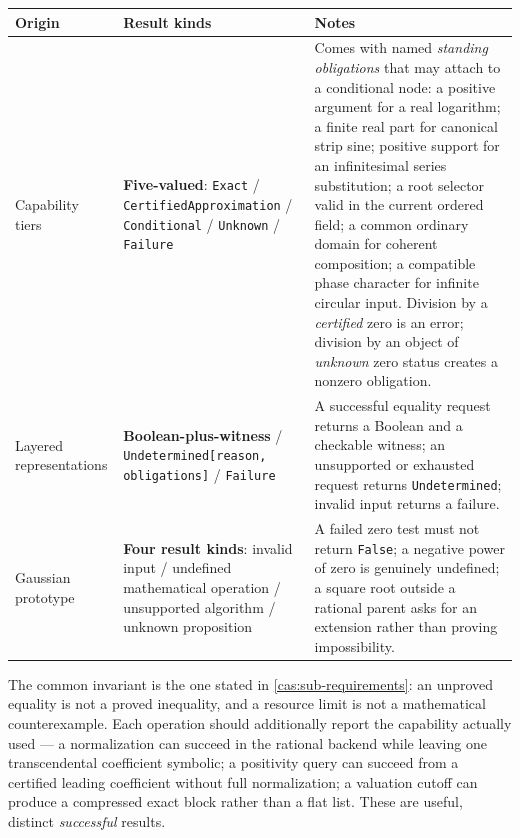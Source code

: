 \documentclass[11pt,letterpaper]{article}
\numberwithin{equation}{section}
\theoremstyle{definition}
\theoremstyle{remark}
\begin{document}
\begingroup\small
\begin{longtable}{@{}P{0.155\textwidth}P{0.40\textwidth}P{0.38\textwidth}@{}}
\toprule
Origin & Result kinds & Notes\\
\midrule\endhead
Capability tiers & \textbf{Five-valued}: \texttt{Exact} /
\texttt{CertifiedApproximation} / \texttt{Conditional} / \texttt{Unknown} /
\texttt{Failure} & Comes with named \emph{standing obligations} that may attach
to a conditional node: a positive argument for a real logarithm; a finite real
part for canonical strip sine; positive support for an infinitesimal series
substitution; a root selector valid in the current ordered field; a common
ordinary domain for coherent composition; a compatible phase character for
infinite circular input. Division by a \emph{certified} zero is an error;
division by an object of \emph{unknown} zero status creates a nonzero
obligation.\\[0.5em]
Layered representations & \textbf{Boolean-plus-witness} /
\texttt{Undetermined[reason, obligations]} / \texttt{Failure} & A successful
equality request returns a Boolean and a checkable witness; an unsupported or
exhausted request returns \texttt{Undetermined}; invalid input returns a
failure.\\[0.5em]
Gaussian prototype & \textbf{Four result kinds}: invalid input / undefined
mathematical operation / unsupported algorithm / unknown proposition & A failed
zero test must not return \texttt{False}; a negative power of zero is genuinely
undefined; a square root outside a rational parent asks for an extension rather
than proving impossibility.\\
\bottomrule
\end{longtable}
\endgroup

The common invariant is the one stated in \cref{cas:sub-requirements}: an
unproved equality is not a proved inequality, and a resource limit is not a
mathematical counterexample. Each operation should additionally report the
capability actually used --- a normalization can succeed in the rational backend
while leaving one transcendental coefficient symbolic; a positivity query can
succeed from a certified leading coefficient without full normalization; a
valuation cutoff can produce a compressed exact block rather than a flat list.
These are useful, distinct \emph{successful} results.
\end{document}
